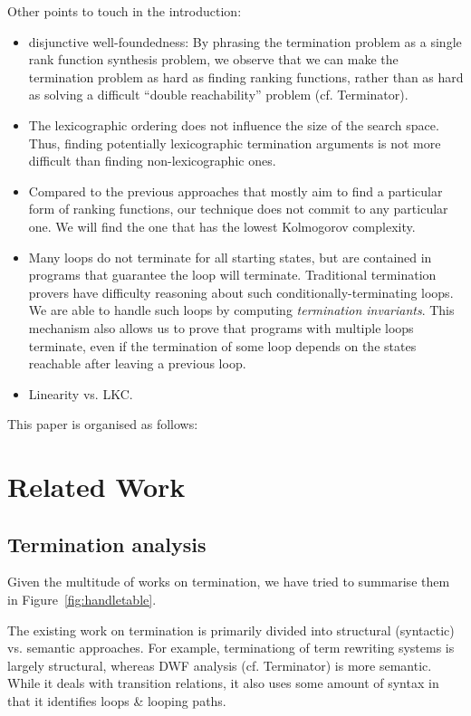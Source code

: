 \documentclass[preprint]{sigplanconf}
\theoremstyle{definition}
\begin{document}
Other points to touch in the introduction:
\begin{itemize}
\item disjunctive well-foundedness: By phrasing the termination problem as a single rank function synthesis problem, we observe that
we can make the termination problem as hard as finding ranking functions, rather than as hard as
solving a difficult ``double reachability'' problem (cf. Terminator).
\item The lexicographic ordering does not influence the size of the search space. Thus, finding potentially lexicographic termination arguments is not more difficult than finding non-lexicographic ones.   
\item Compared to the previous approaches that mostly aim to find a particular form of ranking functions, our technique does not commit to any particular one. We will find the one that has the lowest Kolmogorov complexity.
\item Many loops do not terminate for all starting states, but are contained in programs that guarantee the loop will
terminate.  Traditional termination provers have difficulty reasoning about such conditionally-terminating loops.
We are able to handle such loops by computing \emph{termination invariants}.  This mechanism also allows us to
prove that programs with multiple loops terminate, even if the termination of some loop depends on the states
reachable after leaving a previous loop.
\item Linearity vs. LKC.
\end{itemize}

This paper is organised as follows:

\section{Related Work}
\subsection{Termination analysis}
Given the multitude of works on termination, we have tried to summarise them in Figure~\ref{fig:handletable}. 

The existing work on termination is primarily divided into structural (syntactic) vs. semantic approaches.  
For example, terminationg of term rewriting systems is largely structural, whereas DWF analysis (cf. Terminator) is more semantic. While it deals
with transition relations, it also uses some amount of syntax in that it identifies loops \& looping paths.
\end{document}
